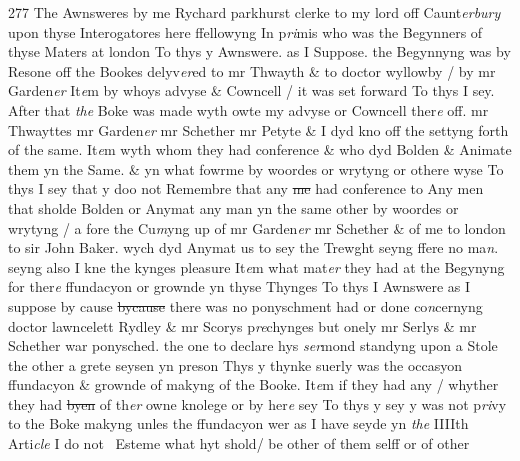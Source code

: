 \documentclass[12pt, a4paper]{book}
\begin{document}
{\color{Mahogany}277} The Awnsweres by me Rychard parkhurst clerke to my lord off Caunt\textit{erbury }upon thyse Interogatores here ffellowyng  
				\marginpar[\vspace{0.5cm}{\textcolor{Gray}{1}}]{}
			 In p\textit{ri}mis who was the Begynners of thyse Maters at london To thys y Awnswere. as I Suppose. the Begynnyng was by Resone off the Bookes delyv\textit{er}ed to mr Thwayth \& to doctor wyllowby / by mr Garden\textit{er} 
				\marginpar[\vspace{0.5cm}{\textcolor{Gray}{2}}]{}
			 It\textit{e}m by whoys advyse \& Cowncell / it was set forward To thys I sey. After that \textit{the} Boke was made wyth owte my advyse or Cowncell ther\textit{e} off. mr Thwayttes mr Garden\textit{er} mr Schether mr Petyte \& I dyd kno off the settyng forth of the same. 
				\marginpar[\vspace{0.5cm}{\textcolor{Gray}{2}}]{}
			 It\textit{e}m wyth whom they had conference \& who dyd Bolden \& Animate them yn the Same. \& yn what fowrme by woordes or wrytyng or othere wyse To thys I sey that y doo not Remembre that any \sout{me }had conference to Any men that sholde Bolden or Anymat any man yn the same other by woordes or wrytyng / a fore the Cu\textit{m}yng up of mr Garden\textit{er} mr Schether \& of
			 me to london to sir John Baker. wych dyd Anymat us to sey the Trewght seyng ffere no ma\textit{n}. seyng also I kne the kynges pleasure 
				\marginpar[\vspace{0.5cm}{\textcolor{Gray}{3}}]{}
			 It\textit{e}m what mat\textit{er} they had at the Begynyng for ther\textit{e} ffundacyon or grownde  yn thyse Thynges To thys I Awnswere as I suppose by cause \sout{bycause }there was no ponyschment had or done co\textit{n}cernyng doctor lawncelett Rydley 
			\& mr Scorys p\textit{re}chynges but onely mr Serlys \& mr Schether war ponysched. the one to declare hys \textit{ser}mond standyng upon a Stole the other a grete seysen yn preson Thys y thynke suerly was the occasyon ffundacyon \& grownde of makyng of the Booke.  
				\marginpar[\vspace{0.5cm}{\textcolor{Gray}{4}}]{}
			 It\textit{e}m if
			 they had any / whyther they had \sout{byen }of th\textit{er }owne knolege or by her\textit{e }sey To thys y sey y was not p\textit{ri}vy to the Boke makyng unles the ffundacyon wer as I have seyde yn \textit{the} IIIIth Arti\textit{cle} I do not  Esteme what hyt shold/ be other of them selff or of other
\end{document}
